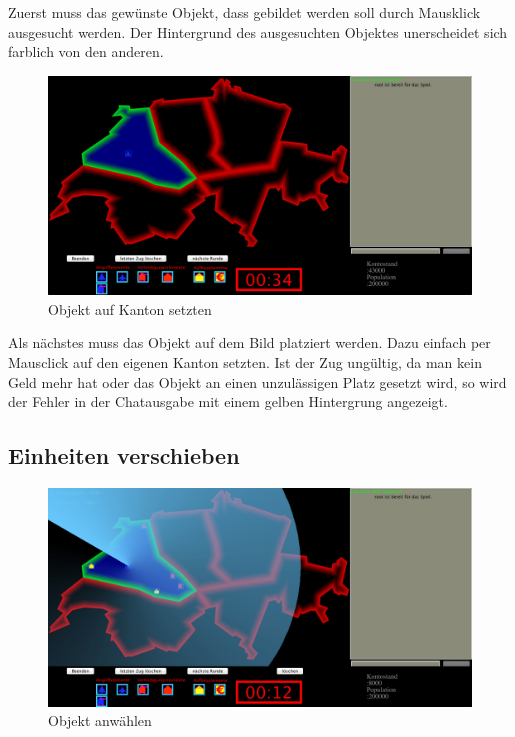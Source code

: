 \documentclass[ngerman, 12pt, pdftex]{scrartcl}[2006/07/30]
\begin{document}
Zuerst muss das gewünste Objekt, dass gebildet werden soll durch Mausklick ausgesucht werden. Der Hintergrund des ausgesuchten Objektes unerscheidet sich farblich von den anderen.

\begin{figure}[h]
\centering
\includegraphics[scale=0.3]{spiel/Objekt_setzen.png}
\caption{Objekt auf Kanton setzten}
\end{figure}

Als nächstes muss das Objekt auf dem Bild platziert werden. Dazu einfach per Mausclick auf den eigenen Kanton setzten. Ist der Zug ungültig, da man kein Geld mehr hat oder das Objekt an einen unzulässigen Platz gesetzt wird, so wird der Fehler in der Chatausgabe mit einem gelben Hintergrung angezeigt.

\newpage

\subsection{Einheiten verschieben}

\begin{figure}[h]
\centering
\includegraphics[scale=0.29]{spiel/Objekt_anwaehlen.png}
\caption{Objekt anw\"{a}hlen}
\end{figure}
\end{document}
